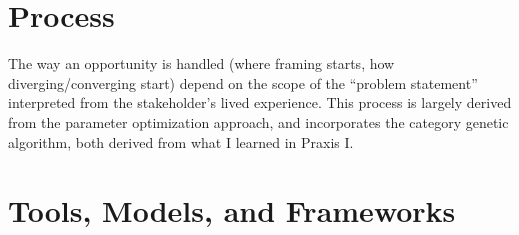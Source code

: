 \documentclass{report}
\begin{document}
\section{Process}
The way an opportunity is handled (where framing starts, how diverging/converging 
start) depend on the scope of the “problem statement” interpreted from the 
stakeholder’s lived experience. This process is largely derived from the 
parameter optimization approach, and incorporates the category genetic algorithm, 
both derived from what I learned in Praxis I.

\section{Tools, Models, and Frameworks}

\subsection{}

\pagebreak




\end{document}
